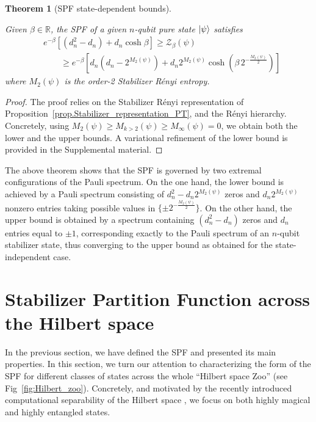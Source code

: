 \documentclass[aps,pra,superscriptaddress,twocolumn,longbibliography]{revtex4-2}
\newtheorem{theorem}{\textbf{Theorem}}
\begin{document}
\begin{theorem}[SPF state-dependent bounds]\label{theorem:SPF_state_dependent_bounds}

Given $\beta \in \mathbb{R}$, the SPF of a given $n$-qubit pure state $\ket{\psi}$ satisfies
%
\begin{align*}
& e^{-\beta}\left[(d_{n}^{2}-d_{n})+d_{n}\cosh{\beta}\right] \geq  \mathcal{Z}_{\beta}(\psi) \\ \nonumber &\qquad\geq
e^{-\beta}\left[d_{n}(d_{n}-2^{M_{2}(\psi)})+ d_{n}2^{M_{2}(\psi)}\cosh{(\beta\, 2^{-\frac{M_{2}(\psi)}{2}})}\right]
\end{align*}
%
where $M_{2}(\psi)$ is the order-2 Stabilizer R\'enyi entropy.
\end{theorem}
%
\begin{proof}
The proof relies on the Stabilizer R\'enyi representation of Proposition~\ref{prop.Stabilizer_representation_PT}, and the R\'enyi hierarchy. 
Concretely, using $M_{2}(\psi) \geq M_{k>2}(\psi)\geq M_{\infty}(\psi)=0$, we obtain both the lower and the upper bounds. 
A variational refinement of the lower bound is provided in the Supplemental material.
\end{proof}
%
The above theorem shows that the SPF is governed by two extremal configurations of the Pauli spectrum. 
On the one hand, the lower bound is achieved by a Pauli spectrum consisting of $d_{n}^{2}-d_{n}2^{M_{2}(\psi)}$ zeros and $d_{n}2^{M_{2}(\psi)}$ nonzero entries taking possible values in $\{\pm 2^{-\frac{M_{2}(\psi)}{2}}\}$. 
On the other hand, the upper bound is obtained by a spectrum containing $(d_{n}^{2}-d_{n})$ zeros and $d_{n}$ entries equal to $\pm 1$, corresponding exactly to the Pauli spectrum of an $n$-qubit stabilizer state, thus converging to the upper bound as obtained for the state-independent case.


\section{Stabilizer Partition Function across the Hilbert space}\label{sec:SPF_across_Hilbert_space}

In the previous section, we have defined the SPF and presented its main properties. 
In this section, we turn our attention to characterizing the form of the SPF for different classes of states across the whole ``Hilbert space Zoo'' (see Fig~\ref{fig:Hilbert_zoo}). Concretely, and motivated by the recently introduced computational separability of the Hilbert space \cite{Gu/Magic_vs_Ent/2024}, we focus on both highly magical and highly entangled states.
\end{document}
